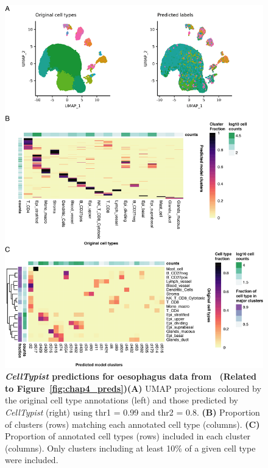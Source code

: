 \begin{figure}[pht!] 
\centering
\includegraphics[scale=0.8]{Appendix3/Figs/appB_oes.png} %
\caption[\textit{CellTypist} predictions for oesophagus data from~\citep{madissoon_lung_2019}]{\textbf{\textit{CellTypist} predictions for oesophagus data from~\citep{madissoon_lung_2019} (Related to Figure~\ref{fig:chap4_preds})}\newline\textbf{(A)} UMAP projections coloured by the original cell type annotations (left) and those predicted by \textit{CellTypist} (right) using thr1 = 0.99 and thr2 = 0.8. \textbf{(B)} Proportion of clusters (rows) matching each annotated cell type (columns). \textbf{(C)} Proportion of annotated cell types (rows) included in each cluster (columns). Only clusters including at least 10\% of a given cell type were included.}
\label{fig:appB_oes}
\end{figure}


